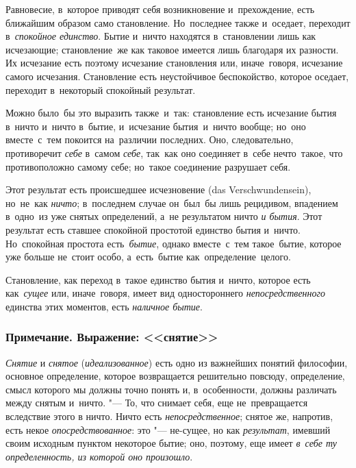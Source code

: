 Равновесие, в~которое приводят себя
возникновение и~прехождение, есть ближайшим образом само становление.
Но~последнее также и~оседает, переходит в~{\em спокойное
единство}. Бытие и~ничто находятся в~становлении лишь как исчезающие;
становление~же как таковое имеется лишь благодаря их разности. Их исчезание
есть поэтому исчезание становления или, иначе~говоря, исчезание самого
исчезания. Становление есть неустойчивое беспокойство, которое оседает,
переходит в~некоторый спокойный результат.

Можно было~бы это выразить также~и~так: становление есть исчезание бытия
в~ничто и~ничто в~бытие, и~исчезание бытия~и~ничто вообще; но~оно
вместе~с~тем покоится на~различии последних. Оно, следовательно,
противоречит {\em себе} в~самом {\em себе}, так~как
оно соединяет в~себе нечто~такое, что противоположно самому себе;
но~такое соединение разрушает себя.

Этот результат есть происшедшее исчезновение (das Verschwundensein),
но~не~как {\em ничто}; в~последнем случае он~был~бы лишь
рецидивом, впадением в~одно~из уже снятых определений, а~не результатом
ничто {\em и бытия}. Этот результат есть ставшее
спокойной простотой единство бытия и~ничто. Но~спокойная простота
есть~{\em бытие}, однако вместе~с~тем такое~бытие, которое
уже больше не~стоит особо, а~есть~бытие как~определение~целого.

Становление, как переход в~такое единство бытия и~ничто, которое есть
как~{\em сущее} или, иначе~говоря, имеет вид одностороннего
{\em непосредственного} единства этих моментов, есть
{\em наличное бытие}.

\subsubsection[Примечание. Выражение: <<снятие>>]
{Примечание. Выражение: <<снятие>>}

{\em Снятие} и {\em снятое}
({\em идеализованное}) есть одно из важнейших понятий
философии, основное определение, которое возвращается решительно повсюду,
определение, смысл которого мы должны точно понять и, в~особенности,
должны различать между снятым и~ничто. "--- То, что снимает себя, еще
не~превращается вследствие этого в ничто. Ничто есть
{\em непосредственное}; снятое же, напротив, есть некое
{\em опосредствованное}: это "--- не-сущее, но как
{\em результат}, имевший своим исходным пунктом
некоторое бытие; оно, поэтому, еще имеет {\em в~себе ту
определенность, из которой оно произошло}.

